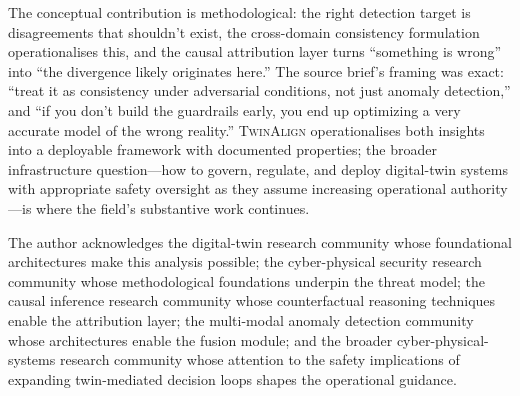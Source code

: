 \documentclass[sigconf,nonacm]{acmart}
\begin{document}
The conceptual contribution is methodological: the right detection
target is disagreements that shouldn't exist, the cross-domain
consistency formulation operationalises this, and the causal
attribution layer turns ``something is wrong'' into ``the
divergence likely originates here.'' The source brief's framing
was exact: ``treat it as consistency under adversarial conditions,
not just anomaly detection,'' and ``if you don't build the
guardrails early, you end up optimizing a very accurate model of
the wrong reality.'' \textsc{TwinAlign} operationalises both
insights into a deployable framework with documented properties;
the broader infrastructure question---how to govern,
regulate, and deploy digital-twin systems with appropriate
safety oversight as they assume increasing operational
authority---is where the field's substantive work continues.

\begin{acks}
The author acknowledges the digital-twin research community whose
foundational architectures make this analysis possible; the
cyber-physical security research community whose methodological
foundations underpin the threat model; the causal inference
research community whose counterfactual reasoning techniques
enable the attribution layer; the multi-modal anomaly detection
community whose architectures enable the fusion module; and the
broader cyber-physical-systems research community whose attention
to the safety implications of expanding twin-mediated decision
loops shapes the operational guidance.
\end{acks}
\end{document}
